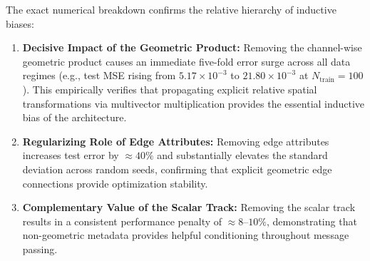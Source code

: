 \documentclass[10pt]{article}
\begin{document}
The exact numerical breakdown confirms the relative hierarchy of inductive biases:
\begin{enumerate}
    \item \textbf{Decisive Impact of the Geometric Product:} Removing the channel-wise geometric product causes an immediate five-fold error surge across all data regimes (e.g., test MSE rising from $5.17 \times 10^{-3}$ to $21.80 \times 10^{-3}$ at $N_{\text{train}}=100$). This empirically verifies that propagating explicit relative spatial transformations via multivector multiplication provides the essential inductive bias of the architecture.
    \item \textbf{Regularizing Role of Edge Attributes:} Removing edge attributes increases test error by $\approx 40\%$ and substantially elevates the standard deviation across random seeds, confirming that explicit geometric edge connections provide optimization stability.
    \item \textbf{Complementary Value of the Scalar Track:} Removing the scalar track results in a consistent performance penalty of $\approx 8\text{--}10\%$, demonstrating that non-geometric metadata provides helpful conditioning throughout message passing.
\end{enumerate}
\end{document}
